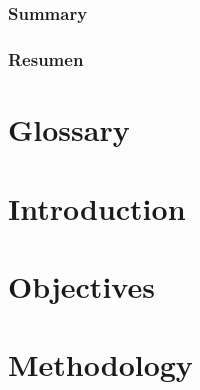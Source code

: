 \documentclass[a4paper,10pt,english]{report} %
\begin{document}
\pagestyle{empty}


\cleardoublepage

\cleardoublepage

\cleardoublepage


\chapter*{}
\thispagestyle{empty}

\begingroup
\begin{flushleft}
\itshape

\end{flushleft}
\endgroup

\cleardoublepage

\subsection*{Summary}

\subsection*{Resumen}


\pagestyle{plain}

\tableofcontents
\listoffigures
\cleardoublepage

\pagestyle{empty}
\chapter*{Glossary}

\cleardoublepage

\pagestyle{headings}



\chapter{Introduction}

\chapter{Objectives}

\chapter{Methodology}

\end{document}
